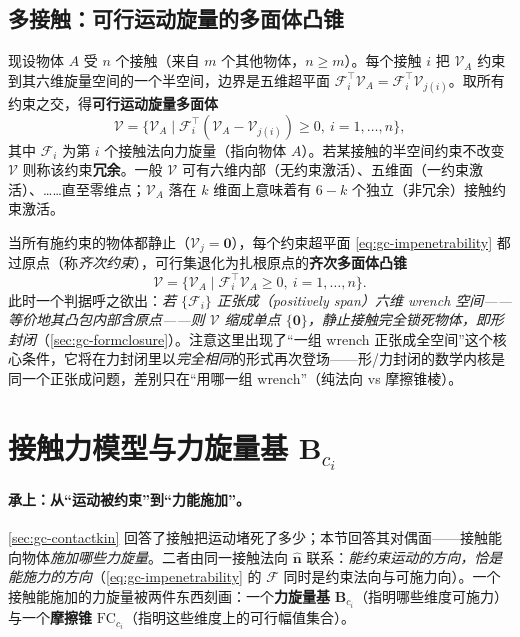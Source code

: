 \subsection{多接触：可行运动旋量的多面体凸锥}
\label{sec:gc-multicontact}

现设物体 $A$ 受 $n$ 个接触（来自 $m$ 个其他物体，$n\ge m$）。每个接触 $i$ 把 $\mathcal{V}_A$ 约束到其六维旋量空间的一个半空间，边界是五维超平面 $\mathcal{F}_i^\top\mathcal{V}_A=\mathcal{F}_i^\top\mathcal{V}_{j(i)}$。取所有约束之交，得\textbf{可行运动旋量多面体}
\begin{equation}
  \mathcal{V}=\{\mathcal{V}_A\mid \mathcal{F}_i^\top(\mathcal{V}_A-\mathcal{V}_{j(i)})\ge0,\ i=1,\dots,n\},
  \label{eq:gc-twist-polytope}
\end{equation}
其中 $\mathcal{F}_i$ 为第 $i$ 个接触法向力旋量（指向物体 $A$）。若某接触的半空间约束不改变 $\mathcal{V}$ 则称该约束\textbf{冗余}。一般 $\mathcal{V}$ 可有六维内部（无约束激活）、五维面（一约束激活）、……直至零维点；$\mathcal{V}_A$ 落在 $k$ 维面上意味着有 $6-k$ 个独立（非冗余）接触约束激活。

\begin{insight}
当所有施约束的物体都静止（$\mathcal{V}_j=\mathbf{0}$），每个约束超平面 \cref{eq:gc-impenetrability} 都过原点（称\emph{齐次约束}），可行集退化为扎根原点的\textbf{齐次多面体凸锥}
\begin{equation}
  \mathcal{V}=\{\mathcal{V}_A\mid \mathcal{F}_i^\top\mathcal{V}_A\ge0,\ i=1,\dots,n\}.
  \label{eq:gc-twist-cone}
\end{equation}
此时一个判据呼之欲出：\emph{若 $\{\mathcal{F}_i\}$ 正张成（positively span）六维 wrench 空间——等价地其凸包内部含原点——则 $\mathcal{V}$ 缩成单点 $\{\mathbf{0}\}$，静止接触完全锁死物体，即形封闭}（\cref{sec:gc-formclosure}）。注意这里出现了“一组 wrench 正张成全空间”这个核心条件，它将在力封闭里以\emph{完全相同}的形式再次登场——形/力封闭的数学内核是同一个正张成问题，差别只在“用哪一组 wrench”（纯法向 vs 摩擦锥棱）。
\end{insight}

\section{接触力模型与力旋量基 \texorpdfstring{$\mathbf{B}_{c_i}$}{B}}
\label{sec:gc-wrenchbasis}

\paragraph{承上：从“运动被约束”到“力能施加”。}
\cref{sec:gc-contactkin} 回答了接触把运动堵死了多少；本节回答其对偶面——接触能向物体\emph{施加哪些力旋量}。二者由同一接触法向 $\hat{\mathbf{n}}$ 联系：\emph{能约束运动的方向，恰是能施力的方向}（\cref{eq:gc-impenetrability} 的 $\mathcal{F}$ 同时是约束法向与可施力向）。一个接触能施加的力旋量被两件东西刻画：一个\textbf{力旋量基} $\mathbf{B}_{c_i}$（指明哪些维度可施力）与一个\textbf{摩擦锥} $\mathrm{FC}_{c_i}$（指明这些维度上的可行幅值集合）。

